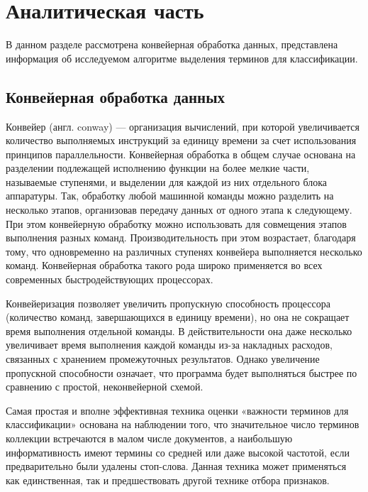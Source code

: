 \chapter{Аналитическая часть}

В данном разделе рассмотрена конвейерная обработка данных, представлена информация об исследуемом алгоритме выделения терминов для классификации.

\section{Конвейерная обработка данных}

Конвейер \cite{conway} (англ. conway) — организация вычислений, при которой увеличивается количество выполняемых инструкций за единицу времени за счет использования принципов параллельности.
Конвейерная обработка в общем случае основана на разделении подлежащей исполнению функции на более мелкие части, называемые ступенями, и выделении для каждой из них отдельного блока аппаратуры. 
Так, обработку любой машинной команды можно разделить на несколько этапов, организовав передачу данных от одного этапа к следующему. При этом конвейерную обработку можно использовать для совмещения этапов выполнения разных команд. Производительность при этом возрастает, благодаря тому, что одновременно на различных ступенях конвейера выполняется несколько команд. 
Конвейерная обработка такого рода широко применяется во всех современных быстродействующих процессорах. 

Конвейеризация позволяет увеличить пропускную способность процессора (количество команд, завершающихся в единицу времени), но она не сокращает время выполнения отдельной команды. В действительности она даже несколько увеличивает время выполнения каждой команды из-за накладных расходов, связанных с хранением промежуточных результатов. 
Однако увеличение пропускной способности означает, что программа будет выполняться быстрее по сравнению с простой, неконвейерной схемой.

Самая простая и вполне эффективная \cite{DF} техника оценки «важности терминов для классификации» основана на наблюдении того, что значительное число терминов коллекции встречаются в малом числе документов, а наибольшую информативность имеют термины со средней или даже высокой частотой, если предварительно были удалены стоп-слова. Данная техника может применяться как единственная, так и предшествовать другой технике отбора признаков.

